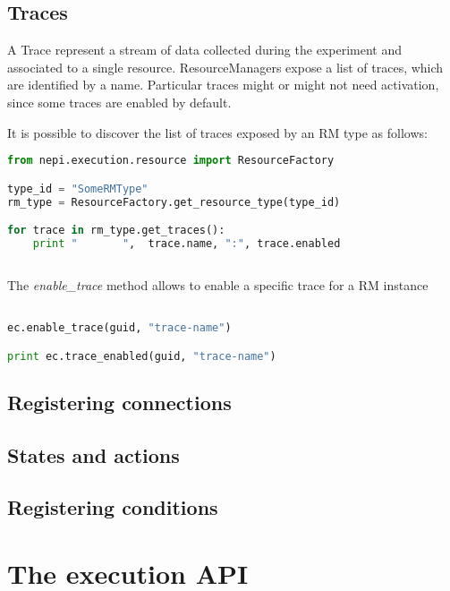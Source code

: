 \subsection{Traces}

A Trace represent a stream of data collected during the experiment and associated
to a single resource. ResourceManagers expose a list of traces, which are identified
by a name. Particular traces might or might not need activation, since some traces
are enabled by default.

It is possible to discover the list of traces exposed by an 
RM type as follows:

\begin{lstlisting}[language=Python]
from nepi.execution.resource import ResourceFactory

type_id = "SomeRMType"
rm_type = ResourceFactory.get_resource_type(type_id)

for trace in rm_type.get_traces():
    print "       ",  trace.name, ":", trace.enabled
    
\end{lstlisting}

The \emph{enable\_trace} method allows to enable a specific trace for a 
RM instance

\begin{lstlisting}[language=Python]

ec.enable_trace(guid, "trace-name")

print ec.trace_enabled(guid, "trace-name")

\end{lstlisting}

\subsection{Registering connections}

\subsection{States and actions}

\subsection{Registering conditions}

\section{The execution API}

